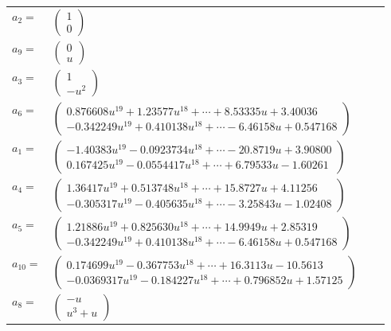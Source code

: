 \documentclass[1p]{elsarticle_modified}
\theoremstyle{definition}
\begin{document}
\begin{tabular}{m{7pt} m{180pt} m{7pt} m{180pt} }
\flushright $a_{2}=$&$\begin{pmatrix}1\\0\end{pmatrix}$ \\
\flushright $a_{9}=$&$\begin{pmatrix}0\\u\end{pmatrix}$ \\
\flushright $a_{3}=$&$\begin{pmatrix}1\\- u^2\end{pmatrix}$ \\
\flushright $a_{6}=$&$\begin{pmatrix}0.876608 u^{19}+1.23577 u^{18}+\cdots+8.53335 u+3.40036\\-0.342249 u^{19}+0.410138 u^{18}+\cdots-6.46158 u+0.547168\end{pmatrix}$ \\
\flushright $a_{1}=$&$\begin{pmatrix}-1.40383 u^{19}-0.0923734 u^{18}+\cdots-20.8719 u+3.90800\\0.167425 u^{19}-0.0554417 u^{18}+\cdots+6.79533 u-1.60261\end{pmatrix}$ \\
\flushright $a_{4}=$&$\begin{pmatrix}1.36417 u^{19}+0.513748 u^{18}+\cdots+15.8727 u+4.11256\\-0.305317 u^{19}-0.405635 u^{18}+\cdots-3.25843 u-1.02408\end{pmatrix}$ \\
\flushright $a_{5}=$&$\begin{pmatrix}1.21886 u^{19}+0.825630 u^{18}+\cdots+14.9949 u+2.85319\\-0.342249 u^{19}+0.410138 u^{18}+\cdots-6.46158 u+0.547168\end{pmatrix}$ \\
\flushright $a_{10}=$&$\begin{pmatrix}0.174699 u^{19}-0.367753 u^{18}+\cdots+16.3113 u-10.5613\\-0.0369317 u^{19}-0.184227 u^{18}+\cdots+0.796852 u+1.57125\end{pmatrix}$ \\
\flushright $a_{8}=$&$\begin{pmatrix}- u\\u^3+u\end{pmatrix}$ \\

\end{tabular}
\end{document}
